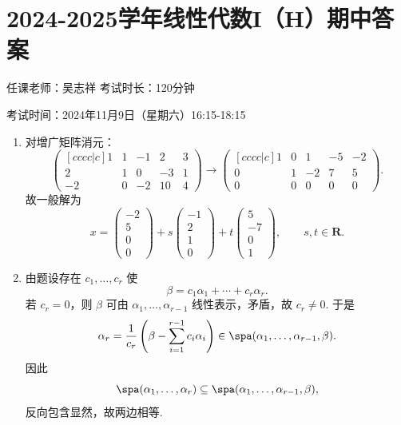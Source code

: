 \section{2024-2025学年线性代数I（H）期中答案}

\begin{center}
    任课老师：吴志祥\hspace{4em} 考试时长：120分钟

    考试时间：2024年11月9日（星期六）16:15-18:15
\end{center}
\begin{enumerate}
    \item 对增广矩阵消元：
    \[
        \begin{pmatrix}[cccc|c]
            1&1&-1&2&3\\
            2&1&0&-3&1\\
            -2&0&-2&10&4
        \end{pmatrix}
        \longrightarrow
        \begin{pmatrix}[cccc|c]
            1&0&1&-5&-2\\
            0&1&-2&7&5\\
            0&0&0&0&0
        \end{pmatrix}.
    \]
    故一般解为
    \[
        x=\begin{pmatrix}-2\\5\\0\\0\end{pmatrix}
        +s\begin{pmatrix}-1\\2\\1\\0\end{pmatrix}
        +t\begin{pmatrix}5\\-7\\0\\1\end{pmatrix},
        \qquad s,t\in\mathbf{R}.
    \]

    \item 由题设存在 $c_1,\ldots,c_r$ 使
    \[
        \beta=c_1\alpha_1+\cdots+c_r\alpha_r.
    \]
    若 $c_r=0$，则 $\beta$ 可由 $\alpha_1,\ldots,\alpha_{r-1}$ 线性表示，矛盾，故 $c_r\neq 0$. 于是
    \[
        \alpha_r=\frac1{c_r}\left(\beta-\sum_{i=1}^{r-1}c_i\alpha_i\right)
        \in\spa(\alpha_1,\ldots,\alpha_{r-1},\beta).
    \]
    因此
    \[
        \spa(\alpha_1,\ldots,\alpha_r)
        \subseteq\spa(\alpha_1,\ldots,\alpha_{r-1},\beta),
    \]
    反向包含显然，故两边相等.


\end{enumerate}
